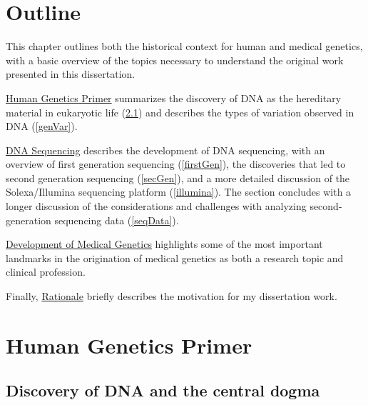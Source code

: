 \documentclass[11pt,letterpaper]{book}
\begin{document}
\hypertarget{outline}{%
\section{Outline}\label{outline}}

This chapter outlines both the historical context for human and medical genetics, with a basic overview of the topics necessary to understand the original work presented in this dissertation.

\protect\hyperlink{humGenPrime}{Human Genetics Primer} summarizes the discovery of DNA as the hereditary material in eukaryotic life (\ref{dnaDiscover}) and describes the types of variation observed in DNA (\ref{genVar}).

\protect\hyperlink{sequencing}{DNA Sequencing} describes the development of DNA sequencing, with an overview of first generation sequencing (\ref{firstGen}), the discoveries that led to second generation sequencing (\ref{secGen}), and a more detailed discussion of the Solexa/Illumina sequencing platform (\ref{illumina}). The section concludes with a longer discussion of the considerations and challenges with analyzing second-generation sequencing data (\ref{seqData}).

\protect\hyperlink{medGen}{Development of Medical Genetics} highlights some of the most important landmarks in the origination of medical genetics as both a research topic and clinical profession.

Finally, \protect\hyperlink{prob}{Rationale} briefly describes the motivation for my dissertation work.

\hypertarget{humGenPrime}{%
\section{Human Genetics Primer}\label{humGenPrime}}

\hypertarget{dnaDiscover}{%
\subsection{Discovery of DNA and the central dogma}\label{dnaDiscover}}
\end{document}
